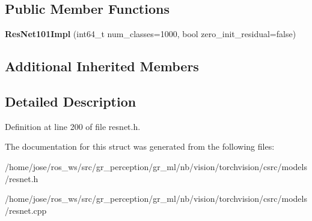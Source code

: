 \subsection*{Public Member Functions}
\begin{DoxyCompactItemize}
\item 
\mbox{\label{structvision_1_1models_1_1ResNet101Impl_abeb7a361bedea723eca60ba911048648}} 
{\bfseries Res\+Net101\+Impl} (int64\+\_\+t num\+\_\+classes=1000, bool zero\+\_\+init\+\_\+residual=false)
\end{DoxyCompactItemize}
\subsection*{Additional Inherited Members}


\subsection{Detailed Description}


Definition at line 200 of file resnet.\+h.



The documentation for this struct was generated from the following files\+:\begin{DoxyCompactItemize}
\item 
/home/jose/ros\+\_\+ws/src/gr\+\_\+perception/gr\+\_\+ml/nb/vision/torchvision/csrc/models/resnet.\+h\item 
/home/jose/ros\+\_\+ws/src/gr\+\_\+perception/gr\+\_\+ml/nb/vision/torchvision/csrc/models/resnet.\+cpp\end{DoxyCompactItemize}
